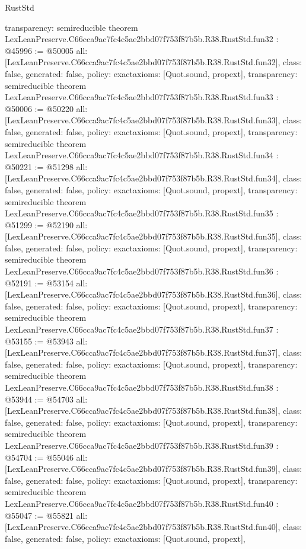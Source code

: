 \begin{lexlean}{RustStd}
\begin{coremodule}
{  transparency: semireducible
}
theorem LexLeanPreserve.C66cca9ac7fc4c5ae2bbd07f753f87b5b.R38.RustStd.fun32 : @45996 := @50005 {
  all: [LexLeanPreserve.C66cca9ac7fc4c5ae2bbd07f753f87b5b.R38.RustStd.fun32],
  class: false,
  generated: false,
  policy: exact{axioms: [Quot.sound, propext]},
  transparency: semireducible
}
theorem LexLeanPreserve.C66cca9ac7fc4c5ae2bbd07f753f87b5b.R38.RustStd.fun33 : @50006 := @50220 {
  all: [LexLeanPreserve.C66cca9ac7fc4c5ae2bbd07f753f87b5b.R38.RustStd.fun33],
  class: false,
  generated: false,
  policy: exact{axioms: [Quot.sound, propext]},
  transparency: semireducible
}
theorem LexLeanPreserve.C66cca9ac7fc4c5ae2bbd07f753f87b5b.R38.RustStd.fun34 : @50221 := @51298 {
  all: [LexLeanPreserve.C66cca9ac7fc4c5ae2bbd07f753f87b5b.R38.RustStd.fun34],
  class: false,
  generated: false,
  policy: exact{axioms: [Quot.sound, propext]},
  transparency: semireducible
}
theorem LexLeanPreserve.C66cca9ac7fc4c5ae2bbd07f753f87b5b.R38.RustStd.fun35 : @51299 := @52190 {
  all: [LexLeanPreserve.C66cca9ac7fc4c5ae2bbd07f753f87b5b.R38.RustStd.fun35],
  class: false,
  generated: false,
  policy: exact{axioms: [Quot.sound, propext]},
  transparency: semireducible
}
theorem LexLeanPreserve.C66cca9ac7fc4c5ae2bbd07f753f87b5b.R38.RustStd.fun36 : @52191 := @53154 {
  all: [LexLeanPreserve.C66cca9ac7fc4c5ae2bbd07f753f87b5b.R38.RustStd.fun36],
  class: false,
  generated: false,
  policy: exact{axioms: [Quot.sound, propext]},
  transparency: semireducible
}
theorem LexLeanPreserve.C66cca9ac7fc4c5ae2bbd07f753f87b5b.R38.RustStd.fun37 : @53155 := @53943 {
  all: [LexLeanPreserve.C66cca9ac7fc4c5ae2bbd07f753f87b5b.R38.RustStd.fun37],
  class: false,
  generated: false,
  policy: exact{axioms: [Quot.sound, propext]},
  transparency: semireducible
}
theorem LexLeanPreserve.C66cca9ac7fc4c5ae2bbd07f753f87b5b.R38.RustStd.fun38 : @53944 := @54703 {
  all: [LexLeanPreserve.C66cca9ac7fc4c5ae2bbd07f753f87b5b.R38.RustStd.fun38],
  class: false,
  generated: false,
  policy: exact{axioms: [Quot.sound, propext]},
  transparency: semireducible
}
theorem LexLeanPreserve.C66cca9ac7fc4c5ae2bbd07f753f87b5b.R38.RustStd.fun39 : @54704 := @55046 {
  all: [LexLeanPreserve.C66cca9ac7fc4c5ae2bbd07f753f87b5b.R38.RustStd.fun39],
  class: false,
  generated: false,
  policy: exact{axioms: [Quot.sound, propext]},
  transparency: semireducible
}
theorem LexLeanPreserve.C66cca9ac7fc4c5ae2bbd07f753f87b5b.R38.RustStd.fun40 : @55047 := @55821 {
  all: [LexLeanPreserve.C66cca9ac7fc4c5ae2bbd07f753f87b5b.R38.RustStd.fun40],
  class: false,
  generated: false,
  policy: exact{axioms: [Quot.sound, propext]},
}
\end{coremodule}
\end{lexlean}
